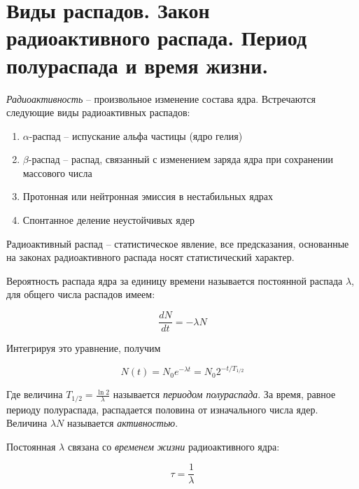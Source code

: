 \section{Виды распадов. Закон радиоактивного распада. Период полураспада и время жизни.}

\textit{Радиоактивность} -- произвольное изменение состава ядра. Встречаются следующие виды радиоактивных распадов:

\begin{enumerate}
    \item $\alpha$-распад -- испускание альфа частицы (ядро гелия)
    \item $\beta$-распад -- распад, связанный с изменением заряда ядра при сохранении массового числа
    \item Протонная или нейтронная эмиссия в нестабильных ядрах
    \item Спонтанное деление неустойчивых ядер
\end{enumerate}

Радиоактивный распад -- статистическое явление, все предсказания, основанные на законах радиоактивного распада носят статистический характер.

Вероятность распада ядра за единицу времени называется постоянной распада $\lambda$, для общего числа распадов имеем:

\begin{equation}
    \frac{d N}{d t} = - \lambda N
\end{equation}

\noindent
Интегрируя это уравнение, получим

\begin{equation}
    N (t) = N_0 e^{- \lambda t} = N_0 2^{- t / T_{1 / 2}}
\end{equation}

Где величина $T_{1 / 2} = \frac{\ln 2}{\lambda}$ называется \textit{периодом полураспада}. За время, равное периоду полураспада, распадается половина от изначального числа ядер. Величина $\lambda N$ называется \textit{активностью}.

Постоянная $\lambda$ связана со \textit{временем жизни} радиоактивного ядра:

\begin{equation}
    \tau = \frac{1}{\lambda}
\end{equation}